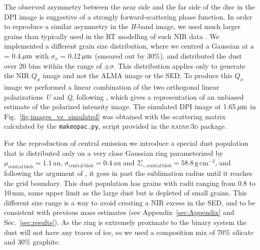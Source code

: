\documentclass[fleqn,usenatbib,useAMS]{mnras}
\begin{document}
The observed asymmetry between the near side and the far side of the disc in the DPI image is suggestive of a strongly forward-scattering phase function. In order to reproduce a similar asymmetry in the \textit{H}-band image, we used much larger grains than typically used in the RT modelling of such NIR data \citep[e.g.,][]{2018MNRAS.477.5104C}. We implemented a different grain size distribution, where we centred a Gaussian at $\mathrm{a}$ = 0.4\,$\hbox{$\mu$m}$ with $\sigma_{\mathrm{a}}$ = 0.12\,$\hbox{$\mu$m}$ (smeared out by 30\%), and distributed the dust over 20 bins within the range of $\pm \sigma$. This distribution applies only to generate the NIR $Q_\phi$ image and not the ALMA image or the SED. To produce this $Q_\phi$ image we performed a linear combination of the two orthogonal linear polarizations \textit{U} and \textit{Q}, following \citet{Avenhaus_2017}, which gives a representation of an unbiased estimate of the polarized intensity image. The simulated DPI image at 1.65\,$\hbox{$\mu$m}$ in Fig.~\ref{fig:images_vs_simulated} was obtained with the scattering matrix calculated by the {\tt makeopac.py}, script provided in the \textsc{radmc3d} package.

For the reproduction of central emission we introduce a special dust population that is distributed only on a very close Gaussian ring parameterized by $\mu_{\mathrm{central\,blob}}=1.1$\,au, $\sigma_{\mathrm{central\,blob}}=0.4$\,au and $\Sigma_{\circ,\mathrm{central\,blob}}=58.8\,\mathrm{g\,cm^{-3}}$, and following the argument of \citet{Francis_2020}, it goes in past the sublimation radius until it reaches the grid boundary. This dust population has grains with radii ranging from 0.8 to 10\,mm, same upper limit as the large dust but is depleted of small grains. This different size range is a way to avoid creating a NIR excess in the SED, and to be consistent with previous mass estimates (see Appendix~\ref{sec:Appendix} and Sec.~\ref{sec:results}). As the ring is extremely proximate to the binary system the dust will not have any traces of ice, so we used a composition mix of 70\% silicate and 30\% graphite.
\end{document}
